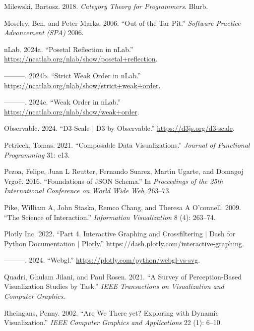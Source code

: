 \documentclass[
]{book}
\newlength{\cslhangindent}
\newenvironment{CSLReferences}[2] %
 {\begin{list}{}{%
  \setlength{\itemindent}{0pt}
  \setlength{\leftmargin}{0pt}
  \setlength{\parsep}{0pt}
  \ifodd #1
   \setlength{\leftmargin}{\cslhangindent}
   \setlength{\itemindent}{-1\cslhangindent}
  \fi
  \setlength{\itemsep}{#2\baselineskip}}}
 {\end{list}}
\theoremstyle{definition}
\theoremstyle{definition}
\theoremstyle{definition}
\theoremstyle{definition}
\theoremstyle{remark}
\begin{document}
\begin{CSLReferences}{1}{0}
Milewski, Bartosz. 2018. \emph{Category Theory for Programmers}. Blurb.

Moseley, Ben, and Peter Marks. 2006. {``Out of the Tar Pit.''} \emph{Software Practice Advancement (SPA)} 2006.

nLab. 2024a. {``Posetal Reflection in nLab.''} \url{https://ncatlab.org/nlab/show/posetal+reflection}.

---------. 2024b. {``Strict Weak Order in nLab.''} \url{https://ncatlab.org/nlab/show/strict+weak+order}.

---------. 2024c. {``Weak Order in nLab.''} \url{https://ncatlab.org/nlab/show/weak+order}.

Observable. 2024. {``D3-Scale {\(\vert\)} D3 by Observable.''} \url{https://d3js.org/d3-scale}.

Petricek, Tomas. 2021. {``Composable Data Visualizations.''} \emph{Journal of Functional Programming} 31: e13.

Pezoa, Felipe, Juan L Reutter, Fernando Suarez, Martı́n Ugarte, and Domagoj Vrgoč. 2016. {``Foundations of JSON Schema.''} In \emph{Proceedings of the 25th International Conference on World Wide Web}, 263--73.

Pike, William A, John Stasko, Remco Chang, and Theresa A O'connell. 2009. {``The Science of Interaction.''} \emph{Information Visualization} 8 (4): 263--74.

Plotly Inc. 2022. {``{Part 4. Interactive Graphing and Crossfiltering {\(\vert\)} Dash for Python Documentation {\(\vert\)} Plotly}.''} \url{https://dash.plotly.com/interactive-graphing}.

---------. 2024. {``Webgl.''} \url{https://plotly.com/python/webgl-vs-svg}.

Quadri, Ghulam Jilani, and Paul Rosen. 2021. {``A Survey of Perception-Based Visualization Studies by Task.''} \emph{IEEE Transactions on Visualization and Computer Graphics}.

Rheingans, Penny. 2002. {``Are We There yet? Exploring with Dynamic Visualization.''} \emph{IEEE Computer Graphics and Applications} 22 (1): 6--10.


\end{CSLReferences}
\end{document}
